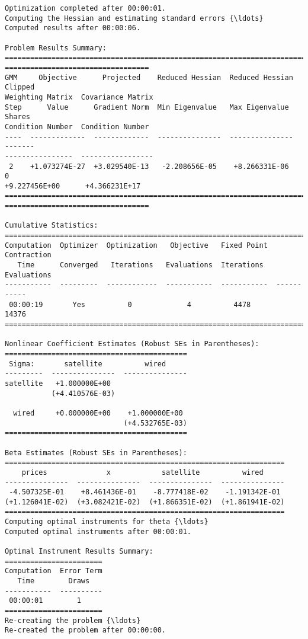 \begin{Verbatim}[commandchars=\\\{\}]
Optimization completed after 00:00:01.
Computing the Hessian and estimating standard errors {\ldots}
Computed results after 00:00:06.

Problem Results Summary:
================================================================================
==================================
GMM     Objective      Projected    Reduced Hessian  Reduced Hessian  Clipped
Weighting Matrix  Covariance Matrix
Step      Value      Gradient Norm  Min Eigenvalue   Max Eigenvalue   Shares
Condition Number  Condition Number
----  -------------  -------------  ---------------  ---------------  -------
----------------  -----------------
 2    +1.073274E-27  +3.029540E-13   -2.208656E-05    +8.266331E-06      0
+9.227456E+00      +4.366231E+17
================================================================================
==================================

Cumulative Statistics:
===========================================================================
Computation  Optimizer  Optimization   Objective   Fixed Point  Contraction
   Time      Converged   Iterations   Evaluations  Iterations   Evaluations
-----------  ---------  ------------  -----------  -----------  -----------
 00:00:19       Yes          0             4          4478         14376
===========================================================================

Nonlinear Coefficient Estimates (Robust SEs in Parentheses):
===========================================
 Sigma:       satellite          wired
---------  ---------------  ---------------
satellite   +1.000000E+00
           (+4.410576E-03)

  wired     +0.000000E+00    +1.000000E+00
                            (+4.532765E-03)
===========================================

Beta Estimates (Robust SEs in Parentheses):
==================================================================
    prices              x            satellite          wired
---------------  ---------------  ---------------  ---------------
 -4.507325E-01    +8.461436E-01    -8.777418E-02    -1.191342E-01
(+1.126041E-02)  (+3.082421E-02)  (+1.866351E-02)  (+1.861941E-02)
==================================================================
Computing optimal instruments for theta {\ldots}
Computed optimal instruments after 00:00:01.

Optimal Instrument Results Summary:
=======================
Computation  Error Term
   Time        Draws
-----------  ----------
 00:00:01        1
=======================
Re-creating the problem {\ldots}
Re-created the problem after 00:00:00.


\end{Verbatim}
